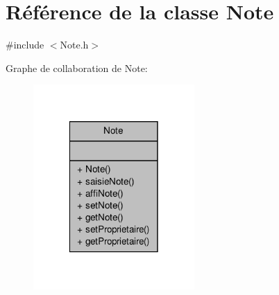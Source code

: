 \hypertarget{class_note}{\section{Référence de la classe Note}
\label{class_note}
}


{\ttfamily \#include $<$Note.\-h$>$}



Graphe de collaboration de Note\-:
\nopagebreak
\begin{figure}[H]
\begin{center}
\leavevmode
\includegraphics[width=174pt]{class_note__coll__graph}
\end{center}
\end{figure}
